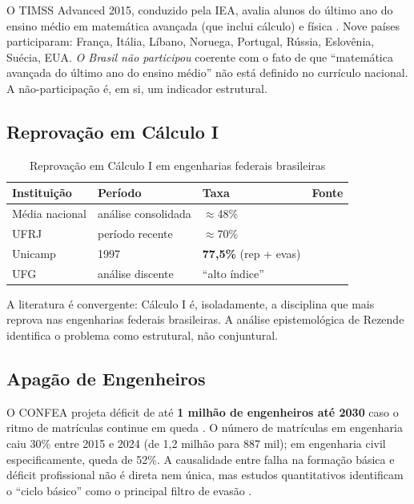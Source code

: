 \documentclass[12pt,a4paper,oneside]{article}
\begin{document}
O TIMSS Advanced 2015, conduzido pela IEA, avalia alunos do último
ano do ensino médio em matemática avançada (que inclui cálculo) e
física \cite{ref:timss-russia}. Nove países participaram: França,
Itália, Líbano, Noruega, Portugal, Rússia, Eslovênia, Suécia, EUA.
\emph{O Brasil não participou} \textemdash{} coerente com o fato de
que ``matemática avançada do último ano do ensino médio'' não está
definido no currículo nacional. A não-participação é, em si, um
indicador estrutural.

\subsection{Reprovação em Cálculo I}

\begin{table}[H]
\centering
\caption{Reprovação em Cálculo I em engenharias federais brasileiras}
\label{tab:reprov-calc1}
\small
\begin{tabular}{@{}lp{3cm}lr@{}}
\toprule
\textbf{Instituição} & \textbf{Período} & \textbf{Taxa} & \textbf{Fonte} \\
\midrule
Média nacional        & análise consolidada     & $\approx$48\%               & \cite{ref:abenge-reprovacao} \\
UFRJ                  & período recente         & $\approx$70\%               & \cite{ref:caeng-ufrj} \\
Unicamp               & 1997\textendash 2009    & \textbf{77,5\%} (rep + evas)& \cite{ref:unicamp-calculo} \\
UFG                   & análise discente        & ``alto índice''             & \cite{ref:contecc-ufg} \\
\bottomrule
\end{tabular}
\end{table}

A literatura é convergente: Cálculo I é, isoladamente, a disciplina
que mais reprova nas engenharias federais brasileiras. A análise
epistemológica de Rezende \cite{ref:rezende-calculo} identifica o
problema como estrutural, não conjuntural.

\subsection{Apagão de Engenheiros}

O CONFEA projeta déficit de até \textbf{1 milhão de engenheiros até
2030} caso o ritmo de matrículas continue em queda
\cite{ref:confea-deficit,ref:otempo-deficit,ref:senge-rj}. O número
de matrículas em engenharia caiu 30\% entre 2015 e 2024 (de 1,2
milhão para 887 mil); em engenharia civil especificamente, queda de
52\%. A causalidade entre falha na formação básica e déficit
profissional não é direta nem única, mas estudos quantitativos
identificam o ``ciclo básico'' como o principal filtro de evasão
\cite{ref:caderno-pedagogico}.
\end{document}
